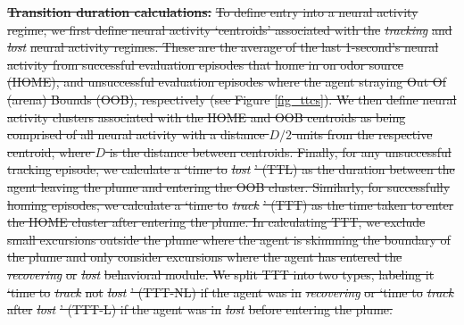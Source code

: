 \documentclass[5p,twocolumn,authoryear]{elsarticle}
\providecommand{\DIFdeltex}[1]{{\protect\color{red}\sout{#1}}}                      %
\providecommand{\DIFdelbegin}{} %
\providecommand{\DIFdelend}{} %
\providecommand{\DIFdel}[1]{\texorpdfstring{\DIFdeltex{#1}}{}} %
\newcommand{\DIFscaledelfig}{0.5}
\newlength{\DIFdelgraphicswidth} %
\newlength{\DIFdelgraphicsheight} %
\newcommand{\DIFdelincludegraphics}[2][]{%
\sbox{\DIFdelgraphicsbox}{\DIFOincludegraphics[#1]{#2}}%
\settoboxwidth{\DIFdelgraphicswidth}{\DIFdelgraphicsbox} %
\settoboxtotalheight{\DIFdelgraphicsheight}{\DIFdelgraphicsbox} %
\scalebox{\DIFscaledelfig}{%
\parbox[b]{\DIFdelgraphicswidth}{\usebox{\DIFdelgraphicsbox}\\[-\baselineskip] \rule{\DIFdelgraphicswidth}{0em}}\llap{\resizebox{\DIFdelgraphicswidth}{\DIFdelgraphicsheight}{%
\setlength{\unitlength}{\DIFdelgraphicswidth}%
\begin{picture}(1,1)%
\thicklines\linethickness{2pt} %
{\color[rgb]{1,0,0}\put(0,0){\framebox(1,1){}}}%
{\color[rgb]{1,0,0}\put(0,0){\line( 1,1){1}}}%
{\color[rgb]{1,0,0}\put(0,1){\line(1,-1){1}}}%
\end{picture}%
}\hspace*{3pt}}} %
} %
\DeclareRobustCommand{\DIFdelbegin}{\DIFOdelbegin \let\includegraphics\DIFdelincludegraphics} %
\DeclareRobustCommand{\DIFdelend}{\DIFOaddend \let\includegraphics\DIFOincludegraphics} %
\begin{document}
\DIFdelbegin \textbf{\DIFdel{Transition duration calculations:}}
\DIFdel{To define entry into a neural activity regime, we first define neural activity `centroids' associated with the }\textit{\DIFdel{tracking}} %
\DIFdel{and }\textit{\DIFdel{lost}} %
\DIFdel{neural activity regimes.
These are the average of the last 1-second's neural activity from successful evaluation episodes that home in on odor source (HOME), and unsuccessful evaluation episodes where the agent straying Out Of (arena) Bounds (OOB), respectively (see Figure \ref{fig_ttcs}). 
We then define neural activity clusters associated with the HOME and OOB centroids as being comprised of all neural activity with a distance $D/2$ units from the respective centroid, where $D$ is the distance between centroids.
Finally,  for any unsuccessful tracking episode, we calculate a `time to }\textit{\DIFdel{lost}}%
\DIFdel{' (TTL) as the duration between the agent leaving the plume and entering the OOB cluster.
Similarly, for successfully homing episodes, we calculate a `time to }\textit{\DIFdel{track}}%
\DIFdel{' (TTT) as the time taken to enter the HOME cluster after entering the plume.
In calculating TTT, we exclude small excursions outside the plume where the agent is skimming the boundary of the plume and only consider excursions where the agent has entered the }\textit{\DIFdel{recovering}} %
\DIFdel{or }\textit{\DIFdel{lost}} %
\DIFdel{behavioral module.
We split TTT into two types, labeling it `time to }\textit{\DIFdel{track}} %
\DIFdel{not }\textit{\DIFdel{lost}}%
\DIFdel{' (TTT-NL) if the agent was in }\textit{\DIFdel{recovering}} %
\DIFdel{or `time to }\textit{\DIFdel{track}} %
\DIFdel{after }\textit{\DIFdel{lost}}%
\DIFdel{' (TTT-L) if the agent was in }\textit{\DIFdel{lost}} %
\DIFdel{before entering the plume. }%
\DIFdelend %
\end{document}
